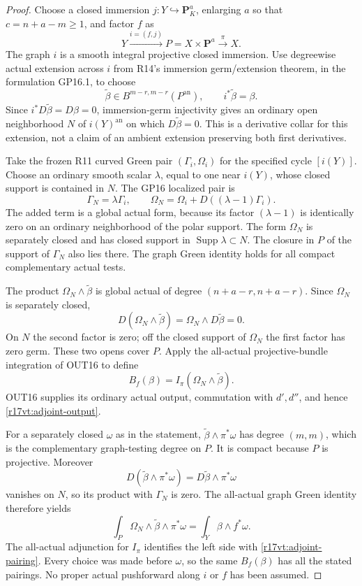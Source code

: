\begin{proof}
Choose a closed immersion $j:Y\hookrightarrow\mathbf P^a_K$,
enlarging $a$ so that $c=n+a-m\ge1$, and factor $f$ as
\[
 Y\xrightarrow{i=(f,j)}P=X\times\mathbf P^a
                  \xrightarrow{\pi}X.
\]
The graph $i$ is a smooth integral projective closed immersion.
Use degreewise actual extension across $i$ from R14's immersion
germ/extension theorem, in the formulation GP16.1, to choose
\[
       \widetilde\beta\in B^{m-r,m-r}(P^{\mathrm{an}}),
                     \qquad i^*\widetilde\beta=\beta.
\]
Since $i^*D\widetilde\beta=D\beta=0$, immersion-germ
injectivity gives an ordinary open neighborhood $N$ of
$i(Y)^{\mathrm{an}}$ on which $D\widetilde\beta=0$.
This is a derivative collar for this extension, not a claim
of an ambient extension preserving both first derivatives.

Take the frozen R11 curved Green pair $(\Gamma_i,\Omega_i)$
for the specified cycle $[i(Y)]$. Choose an ordinary smooth
scalar $\lambda$, equal to one near $i(Y)$, whose closed
support is contained in $N$. The GP16 localized pair is
\[
 \Gamma_N=\lambda\Gamma_i,
 \qquad
 \Omega_N=\Omega_i+D((\lambda-1)\Gamma_i).
 \tag{AD17.3}\label{r17vt:localized-graph}
\]
The added term is a global actual form, because its factor
$(\lambda-1)$ is identically zero on an ordinary neighborhood
of the polar support. The form $\Omega_N$ is separately
closed and has closed support in $\operatorname{Supp}\lambda
\subset N$. The closure in $P$ of the support of $\Gamma_N$
also lies there. The graph Green identity holds for all
compact complementary actual tests.

The product $\Omega_N\wedge\widetilde\beta$ is global actual
of degree $(n+a-r,n+a-r)$. Since $\Omega_N$ is separately
closed,
\[
 D(\Omega_N\wedge\widetilde\beta)
                 =\Omega_N\wedge D\widetilde\beta=0.
\]
On $N$ the second factor is zero; off the closed support of
$\Omega_N$ the first factor has zero germ. These two opens
cover $P$. Apply the all-actual projective-bundle integration
of OUT16 to define
\[
             B_f(\beta)=I_\pi(\Omega_N\wedge\widetilde\beta).
\]
OUT16 supplies its ordinary actual output, commutation with
$d',d''$, and hence \eqref{r17vt:adjoint-output}.

For a separately closed $\omega$ as in the statement,
$\widetilde\beta\wedge\pi^*\omega$ has degree $(m,m)$,
which is the complementary graph-testing degree on $P$.
It is compact because $P$ is projective. Moreover
\[
 D(\widetilde\beta\wedge\pi^*\omega)
                   =D\widetilde\beta\wedge\pi^*\omega
\]
vanishes on $N$, so its product with $\Gamma_N$ is zero.
The all-actual graph Green identity therefore yields
\[
 \int_P\Omega_N\wedge\widetilde\beta\wedge\pi^*\omega
                          =\int_Y\beta\wedge f^*\omega.
\]
The all-actual adjunction for $I_\pi$ identifies the left side
with \eqref{r17vt:adjoint-pairing}. Every choice was made
before $\omega$, so the same $B_f(\beta)$ has all the stated
pairings. No proper actual pushforward along $i$ or $f$ has
been assumed.
\end{proof}


